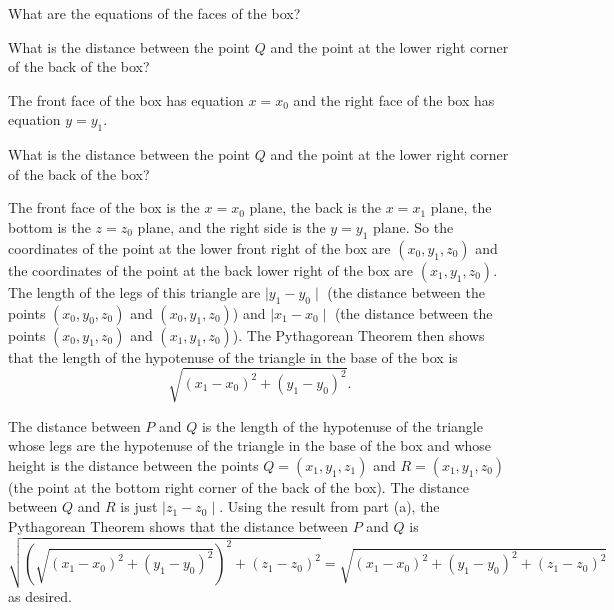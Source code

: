 \begin{smallhint}
\ba
\item What are the equations of the faces of the box?
\item What is the distance between the point $Q$ and the point at the lower right corner of the back of the box? 
\ea

\end{smallhint}
\begin{bighint}
\ba
\item The front face of the box has equation $x=x_0$ and the right face of the box has equation $y=y_1$. 
\item What is the distance between the point $Q$ and the point at the lower right corner of the back of the box? 
\ea
\end{bighint}
\begin{activitySolution}
\ba
\item The front face of the box is the $x=x_0$ plane, the back is the $x=x_1$ plane, the bottom is the $z=z_0$ plane, and the right side is the $y=y_1$ plane. So the coordinates of the point at the lower front right of the box are $(x_0,y_1,z_0)$ and the coordinates of the point at the back lower right of the box are $(x_1, y_1, z_0)$. The length of the legs of this triangle are $\mid y_1-y_0\mid$  (the distance between the points $(x_0, y_0, z_0)$ and $(x_0,y_1,z_0)$) and $\mid x_1-x_0 \mid$ (the distance between the points $(x_0, y_1, z_0)$ and $(x_1,y_1,z_0)$). The Pythagorean Theorem then shows that the length of the hypotenuse of the triangle in the base of the box is  
\[\sqrt{(x_1-x_0)^2+(y_1-y_0)^2}.\]
\item The distance between $P$ and $Q$ is the length of the hypotenuse of the triangle whose legs are the hypotenuse of the triangle in the base of the box and whose height is the distance between the points $Q=(x_1,y_1,z_1)$ and $R=(x_1, y_1, z_0)$ (the point at the bottom right corner of the back of the box). The distance between $Q$ and $R$ is just $\mid z_1-z_0\mid$. Using the result from part (a), the Pythagorean Theorem shows that the distance between $P$ and $Q$ is 
\[\sqrt{\left(\sqrt{(x_1-x_0)^2+(y_1-y_0)^2}\right)^2 + (z_1-z_0)^2} = \sqrt{(x_1-x_0)^2 + (y_1-y_0)^2 + (z_1-z_0)^2}\]
as desired.  
\ea
\end{activitySolution}
\aftera 
